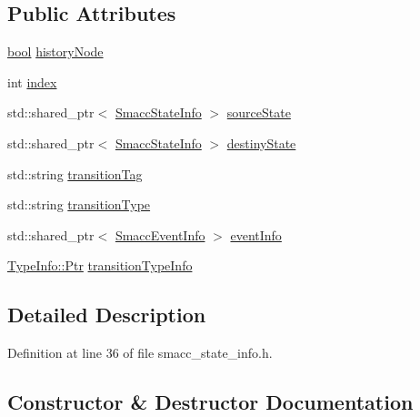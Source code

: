 \subsection*{Public Attributes}
\begin{DoxyCompactItemize}
\item 
\hyperlink{classbool}{bool} \hyperlink{structsmacc_1_1introspection_1_1SmaccTransitionInfo_acbb8f7891dd0c541b26feb82149cb780}{history\+Node}
\item 
int \hyperlink{structsmacc_1_1introspection_1_1SmaccTransitionInfo_a4b9e9f140aefd8ecd6697bcaa4b681af}{index}
\item 
std\+::shared\+\_\+ptr$<$ \hyperlink{classsmacc_1_1introspection_1_1SmaccStateInfo}{Smacc\+State\+Info} $>$ \hyperlink{structsmacc_1_1introspection_1_1SmaccTransitionInfo_aa44f16d098eb91ed222008fe0abf1275}{source\+State}
\item 
std\+::shared\+\_\+ptr$<$ \hyperlink{classsmacc_1_1introspection_1_1SmaccStateInfo}{Smacc\+State\+Info} $>$ \hyperlink{structsmacc_1_1introspection_1_1SmaccTransitionInfo_a041f159a4cd56cfbc005765d093d0d4a}{destiny\+State}
\item 
std\+::string \hyperlink{structsmacc_1_1introspection_1_1SmaccTransitionInfo_aece8c6af9a682232a435ca1d92b953bd}{transition\+Tag}
\item 
std\+::string \hyperlink{structsmacc_1_1introspection_1_1SmaccTransitionInfo_a8f4682c18a3b6c09f6b942a4fa7b524d}{transition\+Type}
\item 
std\+::shared\+\_\+ptr$<$ \hyperlink{structsmacc_1_1introspection_1_1SmaccEventInfo}{Smacc\+Event\+Info} $>$ \hyperlink{structsmacc_1_1introspection_1_1SmaccTransitionInfo_a573be95bb6fdeeae46fc5ed56b260138}{event\+Info}
\item 
\hyperlink{classsmacc_1_1introspection_1_1TypeInfo_aa6ffd9c39811d59f7c771941b7fad860}{Type\+Info\+::\+Ptr} \hyperlink{structsmacc_1_1introspection_1_1SmaccTransitionInfo_abe702ee8041ad32f2290b99c17ab9d95}{transition\+Type\+Info}
\end{DoxyCompactItemize}


\subsection{Detailed Description}


Definition at line 36 of file smacc\+\_\+state\+\_\+info.\+h.



\subsection{Constructor \& Destructor Documentation}
